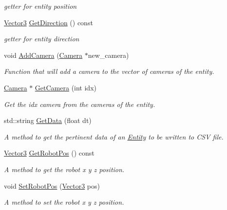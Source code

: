 \begin{DoxyCompactItemize}
\begin{DoxyCompactList}\small\item\em getter for entity position \end{DoxyCompactList}\item 
\hyperlink{classVector3}{Vector3} \hyperlink{classBatteryDecorator_a8487174df54456fe29406927f0542720}{Get\+Direction} () const
\begin{DoxyCompactList}\small\item\em getter for entity direction \end{DoxyCompactList}\item 
void \hyperlink{classBatteryDecorator_a25470bba4af4e6c112a858584a38fcdd}{Add\+Camera} (\hyperlink{classCamera}{Camera} $\ast$new\+\_\+camera)
\begin{DoxyCompactList}\small\item\em Function that will add a camera to the vector of cameras of the entity. \end{DoxyCompactList}\item 
\hyperlink{classCamera}{Camera} $\ast$ \hyperlink{classBatteryDecorator_ad65baa2cd098b990a49bdff7c0fde62c}{Get\+Camera} (int idx)
\begin{DoxyCompactList}\small\item\em Get the idx camera from the cameras of the entity. \end{DoxyCompactList}\item 
std\+::string \hyperlink{classBatteryDecorator_a47475a9179285e30e8c18316cebdac9f}{Get\+Data} (float dt)
\begin{DoxyCompactList}\small\item\em A method to get the pertinent data of an \hyperlink{classEntity}{Entity} to be written to C\+SV file. \end{DoxyCompactList}\item 
\hyperlink{classVector3}{Vector3} \hyperlink{classBatteryDecorator_ac9f7223d439db341e9765ea3d5584f4e}{Get\+Robot\+Pos} () const
\begin{DoxyCompactList}\small\item\em A method to get the robot x y z position. \end{DoxyCompactList}\item 
void \hyperlink{classBatteryDecorator_a183e98816461760d499366e112e5d0a6}{Set\+Robot\+Pos} (\hyperlink{classVector3}{Vector3} pos)
\begin{DoxyCompactList}\small\item\em A method to set the robot x y z position. \end{DoxyCompactList}\end{DoxyCompactItemize}
